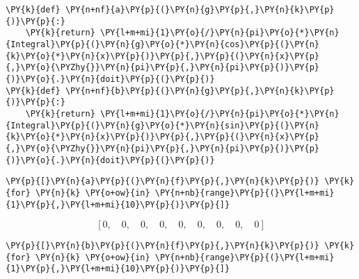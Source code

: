    \begin{tcolorbox}[breakable, size=fbox, boxrule=1pt, pad at break*=1mm,colback=cellbackground, colframe=cellborder]
\begin{Verbatim}[commandchars=\\\{\}]
\PY{k}{def} \PY{n+nf}{a}\PY{p}{(}\PY{n}{g}\PY{p}{,}\PY{n}{k}\PY{p}{)}\PY{p}{:}
    \PY{k}{return} \PY{l+m+mi}{1}\PY{o}{/}\PY{n}{pi}\PY{o}{*}\PY{n}{Integral}\PY{p}{(}\PY{n}{g}\PY{o}{*}\PY{n}{cos}\PY{p}{(}\PY{n}{k}\PY{o}{*}\PY{n}{x}\PY{p}{)}\PY{p}{,}\PY{p}{(}\PY{n}{x}\PY{p}{,}\PY{o}{\PYZhy{}}\PY{n}{pi}\PY{p}{,}\PY{n}{pi}\PY{p}{)}\PY{p}{)}\PY{o}{.}\PY{n}{doit}\PY{p}{(}\PY{p}{)}
\PY{k}{def} \PY{n+nf}{b}\PY{p}{(}\PY{n}{g}\PY{p}{,}\PY{n}{k}\PY{p}{)}\PY{p}{:}
    \PY{k}{return} \PY{l+m+mi}{1}\PY{o}{/}\PY{n}{pi}\PY{o}{*}\PY{n}{Integral}\PY{p}{(}\PY{n}{g}\PY{o}{*}\PY{n}{sin}\PY{p}{(}\PY{n}{k}\PY{o}{*}\PY{n}{x}\PY{p}{)}\PY{p}{,}\PY{p}{(}\PY{n}{x}\PY{p}{,}\PY{o}{\PYZhy{}}\PY{n}{pi}\PY{p}{,}\PY{n}{pi}\PY{p}{)}\PY{p}{)}\PY{o}{.}\PY{n}{doit}\PY{p}{(}\PY{p}{)}
\end{Verbatim}
\end{tcolorbox}

    \begin{tcolorbox}[breakable, size=fbox, boxrule=1pt, pad at break*=1mm,colback=cellbackground, colframe=cellborder]
\begin{Verbatim}[commandchars=\\\{\}]
\PY{p}{[}\PY{n}{a}\PY{p}{(}\PY{n}{f}\PY{p}{,}\PY{n}{k}\PY{p}{)} \PY{k}{for} \PY{n}{k} \PY{o+ow}{in} \PY{n+nb}{range}\PY{p}{(}\PY{l+m+mi}{1}\PY{p}{,}\PY{l+m+mi}{10}\PY{p}{)}\PY{p}{]}
\end{Verbatim}
\end{tcolorbox}
 
            
    
    $$\left [ 0, \quad 0, \quad 0, \quad 0, \quad 0, \quad 0, \quad 0, \quad 0, \quad 0\right ]$$

    

    \begin{tcolorbox}[breakable, size=fbox, boxrule=1pt, pad at break*=1mm,colback=cellbackground, colframe=cellborder]
\begin{Verbatim}[commandchars=\\\{\}]
\PY{p}{[}\PY{n}{b}\PY{p}{(}\PY{n}{f}\PY{p}{,}\PY{n}{k}\PY{p}{)} \PY{k}{for} \PY{n}{k} \PY{o+ow}{in} \PY{n+nb}{range}\PY{p}{(}\PY{l+m+mi}{1}\PY{p}{,}\PY{l+m+mi}{10}\PY{p}{)}\PY{p}{]}
\end{Verbatim}
\end{tcolorbox}
 
